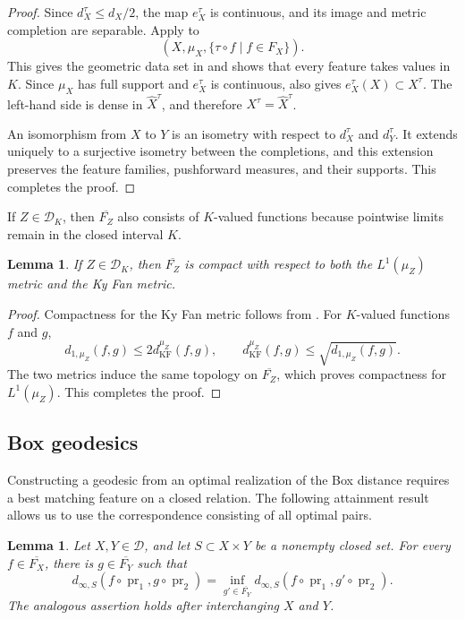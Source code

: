\documentclass[10pt,a4paper]{amsart}
\newtheorem{lemma}[theorem]{Lemma}
\newcommand{\D}{\mathcal D}
\newcommand{\DK}{\mathcal D_K}
\newcommand{\kf}{d_{\operatorname{KF}}}
\DeclareMathOperator{\pr}{pr}
\begin{document}
\begin{proof}
Since $d_X^\tau\leq d_X/2$, the map $e_X^\tau$ is continuous, and its image and metric completion are separable. Apply  to
\[
(X,\mu_X,\{\tau\circ f\mid f\in F_X\}).
\]
This gives the geometric data set in  and shows that every feature takes values in $K$. Since $\mu_X$ has full support and $e_X^\tau$ is continuous,  also gives $e_X^\tau(X)\subset X^\tau$. The left-hand side is dense in $\widehat X^\tau$, and therefore $X^\tau=\widehat X^\tau$.

An isomorphism from $X$ to $Y$ is an isometry with respect to $d_X^\tau$ and $d_Y^\tau$. It extends uniquely to a surjective isometry between the completions, and this extension preserves the feature families, pushforward measures, and their supports. This completes the proof.
\end{proof}

If $Z\in\DK$, then $\overline{F_Z}$ also consists of $K$-valued functions because pointwise limits remain in the closed interval $K$.

\begin{lemma}
\label{lem:K-feature-compactness}
If $Z\in\DK$, then $\overline{F_Z}$ is compact with respect to both the $L^1(\mu_Z)$ metric and the Ky Fan metric.
\end{lemma}

\begin{proof}
Compactness for the Ky Fan metric follows from \cite[Lemma~2.2 and Remark~2.3]{hanika2022gds}. For $K$-valued functions $f$ and $g$,
\[
d_{1,\mu_Z}(f,g)\leq2\kf^{\mu_Z}(f,g),\qquad
\kf^{\mu_Z}(f,g)\leq\sqrt{d_{1,\mu_Z}(f,g)}.
\]
The two metrics induce the same topology on $\overline{F_Z}$, which proves compactness for $L^1(\mu_Z)$. This completes the proof.
\end{proof}

\subsection{Box geodesics}
\label{subsec:box-geodesics}

Constructing a geodesic from an optimal realization of the Box distance requires a best matching feature on a closed relation. The following attainment result allows us to use the correspondence consisting of all optimal pairs.

\begin{lemma}
\label{lem:box-match-attainment}
Let $X,Y\in\D$, and let $S\subset X\times Y$ be a nonempty closed set. For every $f\in\overline{F_X}$, there is $g\in\overline{F_Y}$ such that
\[
d_{\infty,S}(f\circ\pr_1,g\circ\pr_2)
=\inf_{g'\in\overline{F_Y}}
d_{\infty,S}(f\circ\pr_1,g'\circ\pr_2).
\]
The analogous assertion holds after interchanging $X$ and $Y$.
\end{lemma}
\end{document}
